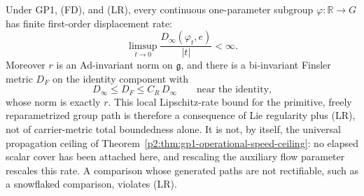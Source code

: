 \documentclass[11pt,a4paper]{article}
\begin{document}
\begin{theorem}
\label{p2:thm:gp1-propagation-derived}
Under GP1, (FD), and (LR), every continuous one-parameter subgroup
\(\varphi:\mathbb R\to G\) has finite first-order displacement rate:
\[
\limsup_{t\to0}\frac{D_\infty(\varphi_t,e)}{|t|}<\infty .
\]
Moreover \(r\) is an Ad-invariant norm on \(\mathfrak g\), and there is a
bi-invariant Finsler metric \(D_F\) on the identity component with
\[
D_\infty\le D_F\le C_R\,D_\infty
\qquad\text{near the identity,}
\]
whose norm is exactly \(r\).  This local Lipschitz-rate
bound for the primitive, freely reparametrized group path is therefore a
consequence of Lie regularity plus (LR), not of carrier-metric total
boundedness alone.  It is not, by itself, the universal propagation ceiling
of Theorem~\ref{p2:thm:gp1-operational-speed-ceiling}: no elapsed scalar cover
has been attached here, and rescaling the auxiliary flow parameter rescales
this rate.  A comparison whose
generated paths are not rectifiable, such as a snowflaked comparison,
violates (LR).
\end{theorem}
\end{document}
